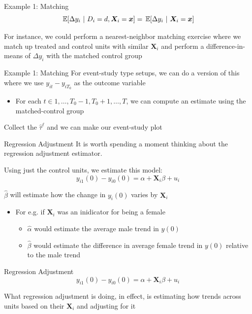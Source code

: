 \documentclass[aspectratio=169,t,11pt,table]{beamer}
\begin{document}
\begin{frame}{Example 1: Matching}
  \vspace*{-\bigskipamount}
  $$
    \expec{\Delta y_i}{D_i = d, \bm{X}_i = \bm{x}} = \expec{\Delta y_i}{\bm{X}_i = \bm{x}}
  $$

  \bigskip
  For instance, we could perform a nearest-neighbor matching exercise where we match up treated and control units with similar $\bm{X}_i$ and perform a difference-in-means of $\Delta y_i$ with the matched control group
\end{frame}

\begin{frame}{Example 1: Matching}
  For event-study type setups, we can do a version of this where
  we use $y_{it} - y_{iT_0}$ as the outcome variable
  \begin{itemize}
    \item For each $t \in 1, \dots, T_0 - 1, T_0 + 1, \dots, T$, we can compute an estimate using the matched-control group
  \end{itemize}

  \bigskip
  Collect the $\hat{\tau}^\ell$ and we can make our event-study plot
\end{frame}

\begin{frame}{Regression Adjustment}
  It is worth spending a moment thinking about the regression adjustment estimator. 
  
  Using just the control units, we estimate this model:
  $$
    y_{i1}(0) - y_{i0}(0) = \alpha + \bm{X}_i \beta + u_i
  $$

  \pause
  \bigskip
  $\hat{\beta}$ will estimate how the change in $y_i(0)$ varies by $\bm{X}_i$
  \begin{itemize}
    \item For e.g. if $\bm{X}_i$ was an inidicator for being a female
    \begin{itemize}
      \item $\hat{\alpha}$ would estimate the average male trend in $y(0)$
      
      \item $\hat{\beta}$ would estimate the difference in average female trend in $y(0)$ relative to the male trend 
    \end{itemize}
  \end{itemize}
\end{frame}

\begin{frame}{Regression Adjustment}
  \vspace*{-\bigskipamount}
  $$
    y_{i1}(0) - y_{i0}(0) = \alpha + \bm{X}_i \beta + u_i
  $$
  
  What regression adjustment is doing, in effect, is estimating how trends across units based on their $\bm{X}_i$ and adjusting for it
\end{frame}
\end{document}
